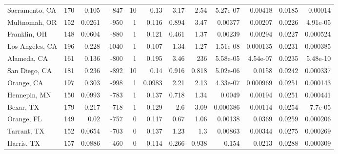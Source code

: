 \documentclass[12pt,letterpaper]{article}
\begin{document}
{\begin{appendices}
\begin{sidewaystable}
{\begin{tabular}{lrrrrrrrrrrr}
 Sacramento, CA     & 170   & 0.105   &  -847 &    10 &          0.13   &            3.17  &          2.54  &          5.27e-07  &           0.00418  &           0.0185  &        0.00014  \\
 Multnomah, OR      & 152   & 0.0261  &  -950 &     1 &          0.116  &            0.894 &          3.47  &          0.00377   &           0.00207  &           0.0226  &        4.91e-05 \\
 Franklin, OH       & 148   & 0.0604  &  -880 &     1 &          0.121  &            0.461 &          1.37  &          0.00239   &           0.00294  &           0.0227  &        0.000524 \\
 Los Angeles, CA    & 196   & 0.228   & -1040 &     1 &          0.107  &            1.34  &          1.27  &          1.51e-08  &           0.000135 &           0.0231  &        0.000385 \\
 Alameda, CA        & 161   & 0.136   &  -800 &     1 &          0.195  &            3.46  &        236     &          5.58e-05  &           4.54e-07 &           0.0235  &        5.48e-10 \\
 San Diego, CA      & 181   & 0.236   &  -892 &    10 &          0.14   &            0.916 &          0.818 &          5.02e-06  &           0.0158   &           0.0242  &        0.000337 \\
 Orange, CA         & 197   & 0.303   &  -998 &     1 &          0.0983 &            2.21  &          2.13  &          4.33e-07  &           0.000969 &           0.0251  &        0.000143 \\
 Hennepin, MN       & 150   & 0.0993  &  -783 &     1 &          0.137  &            0.718 &          1.34  &          0.0049    &           0.00194  &           0.0251  &        0.000441 \\
 Bexar, TX          & 179   & 0.217   &  -718 &     1 &          0.129  &            2.6   &          3.09  &          0.000386  &           0.00114  &           0.0254  &        7.7e-05  \\
 Orange, FL         & 149   & 0.02    &  -757 &     0 &          0.117  &            0.67  &          1.06  &          0.00138   &           0.0369   &           0.0259  &        0.000206 \\
 Tarrant, TX        & 152   & 0.0654  &  -703 &     0 &          0.137  &            1.23  &          1.3   &          0.00863   &           0.00344  &           0.0275  &        0.000269 \\
 Harris, TX         & 157   & 0.0886  &  -460 &     0 &          0.114  &            0.266 &          0.938 &          0.154     &           0.0213   &           0.0288  &        0.000309 \\

\end{tabular}}
\end{sidewaystable}
\end{appendices}}
\end{document}
